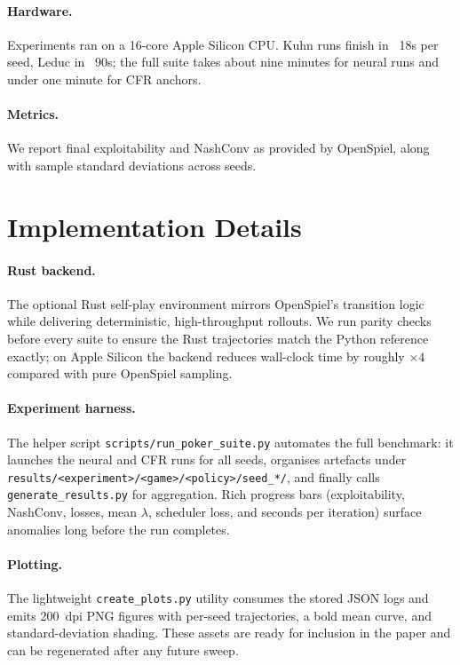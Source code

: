 \documentclass[11pt]{article}
\begin{document}
\paragraph{Hardware.} Experiments ran on a 16-core Apple Silicon CPU. Kuhn runs finish in ~18s per seed, Leduc in ~90s; the full suite takes about nine minutes for neural runs and under one minute for CFR anchors.

\paragraph{Metrics.} We report final exploitability and NashConv as provided by OpenSpiel, along with sample standard deviations across seeds.

\section{Implementation Details}
\paragraph{Rust backend.} The optional Rust self-play environment mirrors OpenSpiel's transition logic while delivering deterministic, high-throughput rollouts. We run parity checks before every suite to ensure the Rust trajectories match the Python reference exactly; on Apple Silicon the backend reduces wall-clock time by roughly $\times4$ compared with pure OpenSpiel sampling.

\paragraph{Experiment harness.} The helper script \texttt{scripts/run\_poker\_suite.py} automates the full benchmark: it launches the neural and CFR runs for all seeds, organises artefacts under \texttt{results/\textless experiment\textgreater/\textless game\textgreater/\textless policy\textgreater/seed\_*/}, and finally calls \texttt{generate\_results.py} for aggregation. Rich progress bars (exploitability, NashConv, losses, mean $\lambda$, scheduler loss, and seconds per iteration) surface anomalies long before the run completes.

\paragraph{Plotting.} The lightweight \texttt{create\_plots.py} utility consumes the stored JSON logs and emits 200~dpi PNG figures with per-seed trajectories, a bold mean curve, and standard-deviation shading. These assets are ready for inclusion in the paper and can be regenerated after any future sweep.
\end{document}
